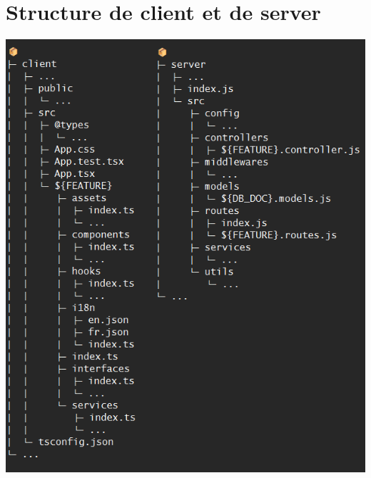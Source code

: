 \section{Structure de client et de server}
\label{Structure de client et de server}
\begin{center}
\includegraphics[width=\linewidth]{medias/structure.png}
\end{center}